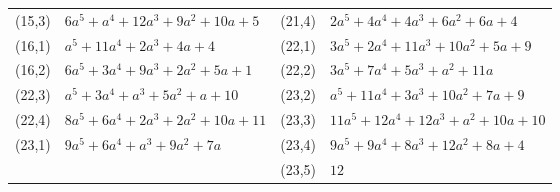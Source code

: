 \documentclass[11pt]{amsart}
\begin{document}
{\begin{center}
\begin{tabular}{@{}llll@{}}
(15,3) & $6a^5{+}a^4{+}12a^3{+}9a^2{+}10a{+}5$ & (21,4) & $2a^5{+}4a^4{+}4a^3{+}6a^2{+}6a{+}4$\\
(16,1) & $a^5{+}11a^4{+}2a^3{+}4a{+}4$ & (22,1) & $3a^5{+}2a^4{+}11a^3{+}10a^2{+}5a{+}9$\\
(16,2) & $6a^5{+}3a^4{+}9a^3{+}2a^2{+}5a{+}1$ & (22,2) & $3a^5{+}7a^4{+}5a^3{+}a^2{+}11a$\\
(22,3) & $a^5{+}3a^4{+}a^3{+}5a^2{+}a{+}10$ & (23,2) & $a^5{+}11a^4{+}3a^3{+}10a^2{+}7a{+}9$\\
(22,4) & $8a^5{+}6a^4{+}2a^3{+}2a^2{+}10a{+}11$ & (23,3) & $11a^5{+}12a^4{+}12a^3{+}a^2{+}10a{+}10$\\
(23,1) & $9a^5{+}6a^4{+}a^3{+}9a^2{+}7a$ & (23,4) & $9a^5{+}9a^4{+}8a^3{+}12a^2{+}8a{+}4$\\
 & & (23,5) & $12$\\
\bottomrule
\end{tabular}
\end{center}}
\end{document}

